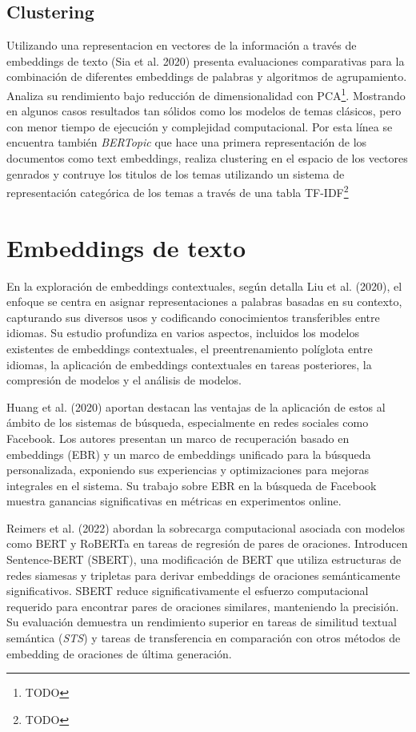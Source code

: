     \subsection{Clustering}
    Utilizando una representacion en vectores de la información a través de embeddings de texto (Sia et al. 2020)\cite{sia2020tired} presenta evaluaciones comparativas para la combinación de diferentes embeddings de palabras y algoritmos de agrupamiento. Analiza su rendimiento bajo reducción de dimensionalidad con PCA\footnote{TODO}. Mostrando en algunos casos resultados tan sólidos como los modelos de temas clásicos, pero con menor tiempo de ejecución y complejidad computacional. 
    Por esta línea se encuentra también \emph{BERTopic}\cite{bertopic} que hace una primera representación de los documentos como text embeddings, realiza clustering en el espacio de los vectores genrados y contruye los titulos de los temas utilizando un sistema de representación categórica de los temas a través de una tabla TF-IDF\footnote{TODO}

\section{Embeddings de texto}
    En la exploración de embeddings contextuales, según detalla Liu et al. (2020)\cite{liu2020survey}, el enfoque se centra en asignar representaciones a palabras basadas en su contexto, capturando sus diversos usos y codificando conocimientos transferibles entre idiomas. Su estudio profundiza en varios aspectos, incluidos los modelos existentes de embeddings contextuales, el preentrenamiento políglota entre idiomas, la aplicación de embeddings contextuales en tareas posteriores, la compresión de modelos y el análisis de modelos.

    Huang et al. (2020)\cite{Huang_2020} aportan destacan las ventajas de la aplicación de estos al ámbito de los sistemas de búsqueda, especialmente en redes sociales como Facebook. Los autores presentan un marco de recuperación basado en embeddings (EBR) y un marco de embeddings unificado para la búsqueda personalizada, exponiendo sus experiencias y optimizaciones para mejoras integrales en el sistema. Su trabajo sobre EBR en la búsqueda de Facebook muestra ganancias significativas en métricas en experimentos online.

    Reimers et al. (2022)\cite{reimers2019sentencebert} abordan la sobrecarga computacional asociada con modelos como BERT y RoBERTa en tareas de regresión de pares de oraciones. Introducen Sentence-BERT (SBERT), una modificación de BERT que utiliza estructuras de redes siamesas y tripletas para derivar embeddings de oraciones semánticamente significativos. SBERT reduce significativamente el esfuerzo computacional requerido para encontrar pares de oraciones similares, manteniendo la precisión. Su evaluación demuestra un rendimiento superior en tareas de similitud textual semántica (\emph{STS}) y tareas de transferencia en comparación con otros métodos de embedding de oraciones de última generación.

